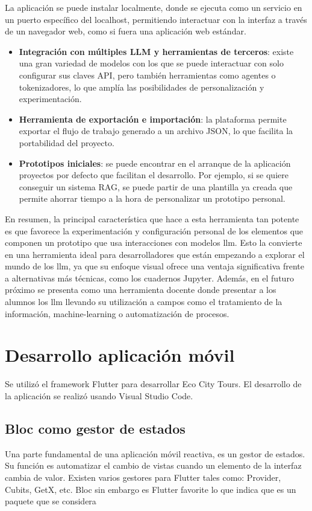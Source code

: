 	La aplicación se puede instalar localmente, donde se ejecuta como un servicio en un puerto específico del localhost, permitiendo interactuar con la interfaz a través de un navegador web, como si fuera una aplicación web estándar.
	\begin{itemize}
		
		\item \textbf{Integración con múltiples LLM y herramientas de terceros}: existe una gran variedad de modelos con los que se puede interactuar con solo configurar sus claves API, pero también herramientas como agentes o tokenizadores, lo que amplía las posibilidades de personalización y experimentación.
		
		\item \textbf{Herramienta de exportación e importación}: la plataforma permite exportar el flujo de trabajo generado a un archivo JSON, lo que facilita la portabilidad del proyecto.
		
		\item \textbf{Prototipos iniciales}: se puede encontrar en el arranque de la aplicación proyectos por defecto que facilitan el desarrollo. Por ejemplo, si se quiere conseguir un sistema RAG, se puede partir de una plantilla ya creada que permite ahorrar tiempo a la hora de personalizar un prototipo personal.
	
	\end{itemize}
	En resumen, la principal característica que hace a esta herramienta tan potente es que favorece la experimentación y configuración personal de los elementos que componen un prototipo que usa interacciones con modelos \acrshort{llm}. Esto la convierte en una herramienta ideal para desarrolladores que están empezando a explorar el mundo de los \acrshort{llm}, ya que su enfoque visual ofrece una ventaja significativa frente a alternativas más técnicas, como los cuadernos Jupyter. Además, en el futuro próximo se presenta como una herramienta docente donde presentar a los alumnos los \acrlong{llm} llevando su utilización a campos como el tratamiento de la información, machine-learning o automatización de procesos.

\section{Desarrollo aplicación móvil}
Se utilizó el framework Flutter para desarrollar Eco City Tours. El desarrollo de la aplicación se realizó usando Visual Studio Code. 
	
	\subsection{Bloc como gestor de estados}
	Una parte fundamental de una aplicación móvil reactiva, es un gestor de estados. Su función es automatizar el cambio de vistas cuando un elemento de la interfaz cambia de valor. Existen varios gestores para Flutter tales como: Provider, Cubits, GetX, etc. Bloc sin embargo es Flutter favorite lo que indica que es un paquete que se considera 
	
